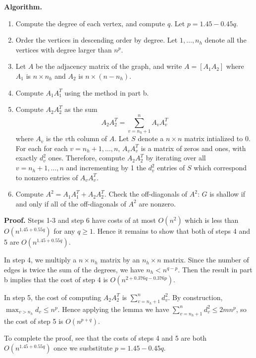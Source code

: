 \documentclass[11pt]{article}
\begin{document}
\newpage
\textbf{Algorithm. }
\begin{enumerate}
\item Compute the degree of each vertex, and compute $q$.  Let $p = 1.45 - 0.45 q$.
\item Order the vertices in descending order by degree. Let $1,\hdots, n_h$
denote all the vertices with degree larger than $n^p$.
\item Let $A$ be the adjacency matrix of the graph, and write $A
= [A_1 A_2]$ where $A_1$ is $n \times n_h$ and $A_2$ is $n \times
(n-n_h)$.
\item Compute $A_1 A_1^T$ using the method in part b.
\item Compute $A_2 A_2^T$ as the sum
\[A_2 A_2^T = \sum_{v = n_h + 1}^n A_v A_v^T\]
where $A_v$ is the $v$th column of $A$.  Let $S$ denote a $n \times n$
matrix intialized to $0$.  For each for each $v = n_h+1,\hdots, n$,
$A_v A_v^T$ is a matrix of zeros and ones, with exactly $d_v^2$ ones.
Therefore, compute $A_2 A_2^T$ by iterating over all $v = n_h +
1,\hdots, n$ and incrementing by 1 the $d_v^2$ entries of $S$ which
correspond to nonzero entries of $A_v A_v^T$.
\item Compute $A^2 = A_1 A_1^T + A_2 A_2^T$.  Check the off-diagonals
  of $A^2$: $G$ is shallow if and only if all of the off-diagonals of
  $A^2$ are nonzero.
\end{enumerate}

\textbf{Proof.}  Steps 1-3 and step 6 have costs of at most $O(n^2)$
which is less than $O(n^{1.45 + 0.55q})$ for any $q \geq 1$.
Hence it remains to show that both of steps 4 and 5 are $O(n^{1.45 + 0.55q})$.

In step 4, we multiply a $n \times n_h$ matrix by an $n_h \times n$
matrix.  Since the number of edges is twice the sum of the degrees, we
have $n_h < n^{q-p}$.  Then the result in part b implies that the cost
of step 4 is $O(n^{2 +0.376q-0.376p})$.


In step 5, the cost of computing $A_2 A_2^T$ is $\sum_{v = n_h + 1}^n
d_v^2$.  By construction, $\max_{v  > n_h} d_v \leq n^p$.
Hence applying the lemma we have $\sum_{v = n_h + 1}^n d_v^2 \leq 2
m n^p$, so the cost of step 5 is $O(n^{p+q})$.

To complete the proof, see that the costs of steps 4 and 5 are both
$O(n^{1.45 + 0.55q})$ once we susbstitute $p = 1.45 - 0.45 q$.
\end{document}
